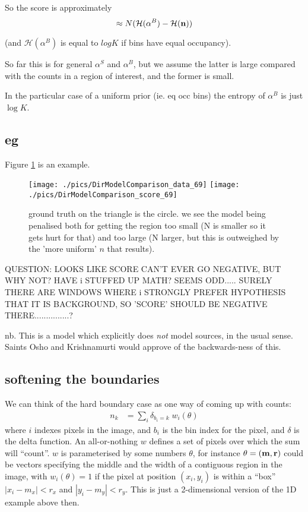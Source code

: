 \documentclass[11pt]{article}
\begin{document}
So the score is approximately
\begin{equation}
\approx N(\mathcal{H}(\alpha^B) - \mathcal{H}(\mathbf{n}))
\end{equation}

(and $\mathcal{H}(\alpha^B)$ is equal to $log K$ if bins have equal occupancy).

So far this is for general $\alpha^S$ and $\alpha^B$, but we assume
the latter is large compared with the counts in a region of interest,
and the former is small.

In the particular case of a uniform prior (ie. eq occ bins) the
entropy of $\alpha^B$ is just $\log K$.

\subsection{eg}

Figure \ref{fig:DirichletMultinomialModelComparisonExample}  is an example.

\begin{figure}
\begin{center}
\texttt{[image: ./pics/DirModelComparison\_data\_69]}
\texttt{[image: ./pics/DirModelComparison\_score\_69]}
\caption{\label{fig:DirichletMultinomialModelComparisonExample} 
ground truth on the triangle is the circle. we see the model being penalised both for getting the region too small (N is smaller so it gets hurt for that) and too large (N larger, but this is outweighed by the 'more uniform' $n$ that results).
}
\end{center}
\end{figure}

QUESTION: LOOKS LIKE SCORE CAN'T EVER GO NEGATIVE, BUT WHY NOT? HAVE i STUFFED UP MATH? SEEMS ODD..... SURELY THERE ARE WINDOWS WHERE i STRONGLY PREFER HYPOTHESIS THAT IT IS BACKGROUND, SO 'SCORE' SHOULD BE NEGATIVE THERE...............?

nb. This is a model which explicitly does {\it not} model sources, in the
usual sense. Saints Osho and Krishnamurti would approve of the
backwards-ness of this.

\subsection{softening the boundaries}

We can think of the hard boundary case as one way of coming up with counts:
\begin{align}
n_k &= \sum_i \delta_{b_i=k} \; w_i(\theta) 
\end{align}
where $i$ indexes pixels in the image, and $b_i$ is the bin index for
the \ith pixel, and $\delta$ is the delta function. An all-or-nothing
$w$ defines a set of pixels over which the sum will ``count''. $w$ is
parameterised by some numbers $\theta$, for instance
$\theta=(\mathbf{m},\mathbf{r})$ could be vectors specifying the middle and the
width of a contiguous region in the image, with $w_i(\theta)=1$ if the
\ith pixel at position $(x_i,y_i)$ is within a ``box'' $| x_i - m_{x}|
< r_x$ and $| y_i - m_{y}| < r_y$. This is just a 2-dimensional
version of the 1D example above then.
\end{document}
